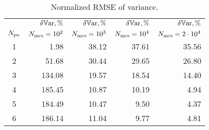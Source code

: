 \begin{table}
  \centering
  \caption{Normalized RMSE of variance.}
  \vspace{-10pt}
  \begin{tabular}{crrrr}
    \toprule
    {} & $\delta\mathbb{V}\text{ar}, \%$ & $\delta\mathbb{V}\text{ar}, \%$ & $\delta\mathbb{V}\text{ar}, \%$ & $\delta\mathbb{V}\text{ar}, \%$ \\
    ${N_\text{po}}$ & $N_\text{mcs} = 10^2$ & $N_\text{mcs} = 10^3$ & $N_\text{mcs} = 10^4$ & $N_\text{mcs} = 2 \cdot 10^4$ \\
    \midrule
    1 &   1.98 & 38.12 & 37.61 & 35.56 \\
    2 &  51.68 & 30.44 & 29.65 & 26.80 \\
    3 & 134.08 & 19.57 & 18.54 & 14.40 \\
    4 & 185.45 & 10.87 & 10.19 &  4.94 \\
    5 & 184.49 & 10.47 &  9.50 &  4.37 \\
    6 & 186.14 & 11.04 &  9.77 &  4.81 \\
    \bottomrule
  \end{tabular}
  \vspace{-10pt}
\end{table}
